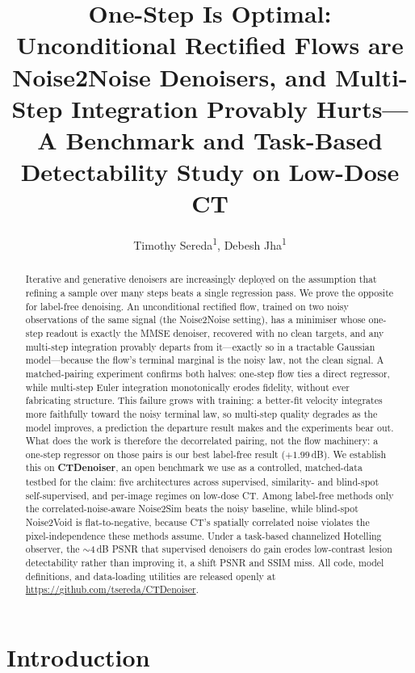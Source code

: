\documentclass[letterpaper]{article} %
\title{One-Step Is Optimal: Unconditional Rectified Flows are\\
       Noise2Noise Denoisers, and Multi-Step Integration Provably Hurts---\\
       A Benchmark and Task-Based Detectability Study on Low-Dose CT}
\author{
    Timothy Sereda\textsuperscript{1},
    Debesh Jha\textsuperscript{1}
}
\begin{document}
\maketitle

\begin{abstract}
Iterative and generative denoisers are increasingly deployed on the assumption
that refining a sample over many steps beats a single regression pass.  We prove
the opposite for label-free denoising.  An unconditional rectified
flow, trained on two noisy observations of the same signal (the Noise2Noise
setting), has a minimiser whose one-step readout is exactly the MMSE
denoiser, recovered with no clean targets, and any multi-step integration
provably departs from it---exactly so in a tractable Gaussian model---because
the flow's terminal marginal is the noisy law, not the clean signal.  A
matched-pairing experiment confirms both halves: one-step flow ties a direct
regressor, while multi-step Euler integration monotonically erodes fidelity,
without ever fabricating structure.  This failure grows
with training: a better-fit velocity integrates more faithfully toward the noisy
terminal law, so multi-step quality degrades as the model improves, a prediction
the departure result makes and the experiments bear out.
What does the work is therefore the decorrelated pairing, not the flow
machinery: a one-step regressor on those pairs is our best label-free result
($+1.99$\,dB).  We establish this on \textbf{CTDenoiser}, an open benchmark we use
as a controlled, matched-data testbed for the claim: five architectures across
supervised, similarity- and blind-spot self-supervised, and per-image regimes on
low-dose CT.  Among label-free methods only the correlated-noise-aware Noise2Sim
beats the noisy baseline, while blind-spot Noise2Void is
flat-to-negative, because CT's spatially correlated noise violates the
pixel-independence these methods assume.  Under a task-based channelized
Hotelling observer, the $\sim$4\,dB PSNR that supervised denoisers do gain
erodes low-contrast lesion detectability rather than improving it, a shift
PSNR and SSIM miss.  All code, model definitions, and data-loading utilities are
released openly at \url{https://github.com/tsereda/CTDenoiser}.
\end{abstract}

\section{Introduction}
\end{document}
